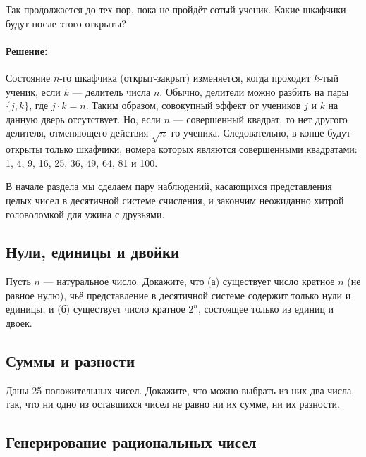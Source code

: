 Так продолжается до тех пор, пока не пройдёт сотый ученик.
Какие шкафчики будут после этого открыты?
 
\paragraph{Решение:}

Состояние $n$-го шкафчика (открыт-закрыт) изменяется, когда проходит $k$-тый ученик, если $k$ --- делитель числа $n$.
Обычно, делители можно разбить на пары $\{j,k\}$, где $j\cdot k=n$.
Таким образом, совокупный эффект от учеников $j$ и $k$ на данную дверь отсутствует. %
Но, если $n$ --- совершенный квадрат, то нет другого делителя, отменяющего действия $\sqrt{n}$-го ученика.
Следовательно, в конце будут открыты только шкафчики, номера которых являются совершенными квадратами: 1, 4, 9, 16, 25, 36, 49, 64, 81 и 100.\heart
 
В начале раздела мы сделаем пару наблюдений, касающихся представления целых чисел в десятичной системе счисления, и закончим неожиданно хитрой головоломкой для ужина с друзьями. %

\subsection*{Нули, единицы и двойки}%

Пусть $n$ --- натуральное число.
Докажите, что (а) существует число кратное $n$ (не равное нулю), чьё представление в десятичной системе содержит только нули и единицы, и
(б) существует число кратное $2^n$, состоящее только из единиц и двоек.

\subsection*{Суммы и разности} %

Даны 25 положительных чисел.
Докажите, что можно выбрать из них два числа, так, что ни одно из оставшихся чисел не равно ни их сумме, ни их разности.

\subsection*{Генерирование рациональных чисел}%

